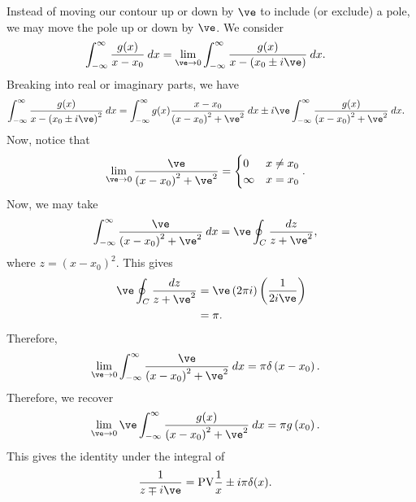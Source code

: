 \documentclass[10pt]{mypackage}
\begin{document}
   \begin{example}
     Instead of moving our contour up or down by $\ve$ to include (or exclude) a pole, we may move the pole up or down by $\ve$. We consider
     \begin{align*}
       \int_{-\infty}^{\infty} \frac{g(x)}{x-x_0}\:dx &= \lim_{\ve\rightarrow 0} \int_{-\infty}^{\infty} \frac{g(x)}{x -\left( x_0\pm i\ve \right)}\:dx.
     \end{align*}
     Breaking into real or imaginary parts, we have
     \begin{align*}
       \int_{-\infty}^{\infty} \frac{g(x)}{x-\left( x_0 \pm i\ve \right)^2}\:dx &= \int_{-\infty}^{\infty} g(x)\frac{x-x_0}{\left( x-x_0 \right)^2 + \ve^2}\:dx \pm i\ve \int_{-\infty}^{\infty} \frac{g(x)}{\left( x-x_0 \right)^2 + \ve^2}\:dx.
     \end{align*}
     Now, notice that
     \begin{align*}
       \lim_{\ve \rightarrow 0}\frac{\ve}{\left( x-x_0 \right)^2 + \ve^2} &= \begin{cases}
         0 & x\neq x_0\\
         \infty & x = x_0
       \end{cases}.
     \end{align*}
     Now, we may take
     \begin{align*}
       \int_{-\infty}^{\infty} \frac{\ve}{\left( x-x_0 \right)^2 + \ve^2}\:dx &= \ve \oint_{C}\frac{dz}{z + \ve^2},
     \end{align*}
     where $z = \left( x-x_0 \right)^2$. This gives
     \begin{align*}
       \ve\oint_{C}\frac{dz}{z + \ve^2} &= \ve \left( 2\pi i \right)\left( \frac{1}{2i \ve} \right)\\
                                        &= \pi.
     \end{align*}
     Therefore, 
     \begin{align*}
       \lim_{\ve\rightarrow 0} \int_{-\infty}^{\infty} \frac{\ve}{\left( x-x_0 \right)^2 + \ve^2}\:dx &= \pi\delta\left( x-x_0 \right).
     \end{align*}
     Therefore, we recover
     \begin{align*}
       \lim_{\ve\rightarrow 0}\ve\int_{-\infty}^{\infty} \frac{g(x)}{\left( x-x_0 \right)^2+ \ve^2}\:dx &= \pi g\left(x_0\right).
     \end{align*}
     This gives the identity under the integral of
     \begin{align*}
       \frac{1}{z\mp i\ve} &= \text{PV}\frac{1}{x} \pm i\pi\delta(x).
     \end{align*}
   \end{example}
\end{document}
